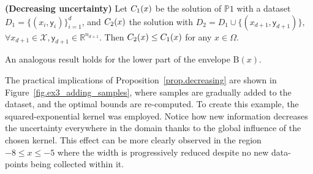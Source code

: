\begin{proposition} 
	\label{prop.decreasing}
	{\normalfont \textbf{(Decreasing uncertainty)}}
	Let $C_{{\normalfont 1}}(x)$ be the solution of $\mathds{P}1$ with a dataset $D_1 = \{(x_i,\mathsf{y}_i)\}_{i=1}^{d}$, and $C_{{\normalfont 2}}(x)$ the solution with $D_2 = D_1 \cup \{(x_{d+1},\mathsf{y}_{d+1})\}$, $\forall x_{d+1} \in \mathcal{X}, \mathsf{y}_{d+1} \in \mathbb{R}^{n_{d+1}}$. Then $C_{{\normalfont 2}}(x) \leq C_{{\normalfont 1}}(x)$ for any $x \in \Omega$. 
\end{proposition}

\begin{remark}
	An analogous result holds for the lower part of the envelope $\text{B}(x)$.
\end{remark}

The practical implications of Proposition~\ref{prop.decreasing}  are shown in Figure~\ref{fig.ex3_adding_samples}, where samples are gradually added to the dataset, and the optimal bounds are re-computed. To create this example, the squared-exponential kernel was employed. Notice how new information decreases the uncertainty everywhere in the domain thanks to the global influence of the chosen kernel. This effect can be more clearly observed in the region $ -8 \leq x \leq -5$ where the width is progressively reduced despite no new data-points being collected within it.


